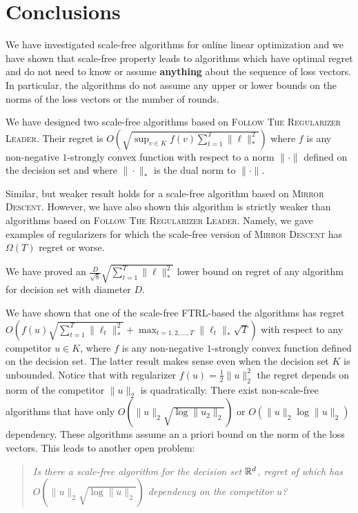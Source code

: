 \section{Conclusions}
\label{section:conclusions}

We have investigated scale-free algorithms for online linear optimization and
we have shown that scale-free property leads to algorithms which have optimal
regret and do not need to know or assume \textbf{anything} about the sequence
of loss vectors. In particular, the algorithms do not assume any upper or lower
bounds on the norms of the loss vectors or the number of rounds.

We have designed two scale-free algorithms based on \textsc{Follow The
Regularizer Leader}.  Their regret is $O \left(\sqrt{\sup_{v \in K} f(v)
\sum_{t=1}^T \|\ell\|_*^2} \right)$ where $f$ is any non-negative $1$-strongly
convex function with respect to a norm $\|\cdot\|$ defined on the decision set
and where $\|\cdot\|_*$ is the dual norm to $\|\cdot\|$.

Similar, but weaker result holds for a scale-free algorithm based on
\textsc{Mirror Descent}. However, we have also shown this algorithm is strictly
weaker than algorithms based on \textsc{Follow The Regularizer Leader}. Namely,
we gave examples of regularizers for which the scale-free version of
\textsc{Mirror Descent} has $\Omega(T)$ regret or worse.

We have proved an $\frac{D}{\sqrt{8}} \sqrt{\sum_{t=1}^T \|\ell\|_*^2}$
lower bound on regret of any algorithm for decision set with diameter $D$.

We have shown that one of the scale-free \textsc{FTRL}-based the algorithms has
regret $O \left(f(u) \sqrt{\sum_{t=1}^T \|\ell_t\|_*^2} + \max_{t=1,2,\dots,T}
\|\ell_t\|_* \sqrt{T} \right)$ with respect to any competitor $u \in K$, where
$f$ is any non-negative $1$-strongly convex function defined on the decision
set.  The latter result makes sense even when the decision set $K$ is
unbounded. Notice that with regularizer $f(u) = \frac{1}{2}\|u\|_2^2$ the
regret depends on norm of the competitor $\|u\|_2$ is quadratically. There
exist non-scale-free algorithms \cite{McMahan-Streeter-2012,
McMahan-Abernethy-2013, Orabona-2013, McMahan-Orabona-2014, Orabona-2014} that
have only $O(\|u\|_2 \sqrt{\log \|u_2\|_2})$ or $O(\|u\|_2 \log \|u\|_2)$
dependency.  These algorithms assume an a priori bound on the norm of the loss
vectors.  This leads to another open problem:
%
\begin{quotation}
\noindent
\emph{Is there a scale-free algorithm for the decision set $\mathbb{R}^d$, regret of
which has $O(\|u\|_2 \sqrt{\log \|u\|_2})$ dependency on the competitor $u$?}
\end{quotation}
